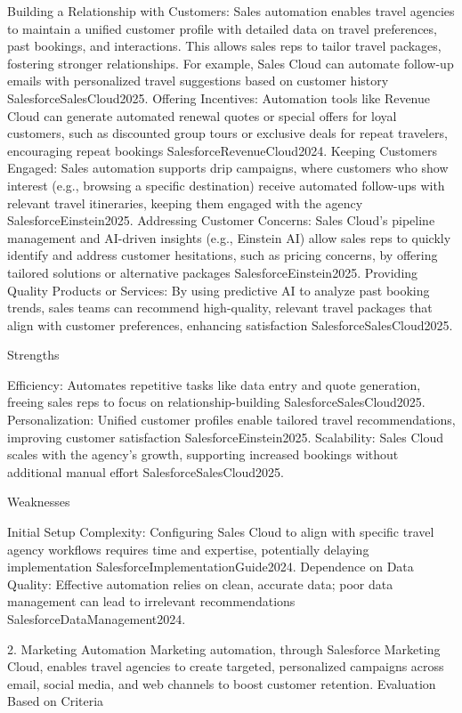 Building a Relationship with Customers: Sales automation enables travel agencies to maintain a unified customer profile with detailed data on travel preferences, past bookings, and interactions. This allows sales reps to tailor travel packages, fostering stronger relationships. For example, Sales Cloud can automate follow-up emails with personalized travel suggestions based on customer history {SalesforceSalesCloud2025}.
Offering Incentives: Automation tools like Revenue Cloud can generate automated renewal quotes or special offers for loyal customers, such as discounted group tours or exclusive deals for repeat travelers, encouraging repeat bookings {SalesforceRevenueCloud2024}.
Keeping Customers Engaged: Sales automation supports drip campaigns, where customers who show interest (e.g., browsing a specific destination) receive automated follow-ups with relevant travel itineraries, keeping them engaged with the agency {SalesforceEinstein2025}.
Addressing Customer Concerns: Sales Cloud’s pipeline management and AI-driven insights (e.g., Einstein AI) allow sales reps to quickly identify and address customer hesitations, such as pricing concerns, by offering tailored solutions or alternative packages {SalesforceEinstein2025}.
Providing Quality Products or Services: By using predictive AI to analyze past booking trends, sales teams can recommend high-quality, relevant travel packages that align with customer preferences, enhancing satisfaction {SalesforceSalesCloud2025}.

Strengths

Efficiency: Automates repetitive tasks like data entry and quote generation, freeing sales reps to focus on relationship-building {SalesforceSalesCloud2025}.
Personalization: Unified customer profiles enable tailored travel recommendations, improving customer satisfaction {SalesforceEinstein2025}.
Scalability: Sales Cloud scales with the agency’s growth, supporting increased bookings without additional manual effort {SalesforceSalesCloud2025}.

Weaknesses

Initial Setup Complexity: Configuring Sales Cloud to align with specific travel agency workflows requires time and expertise, potentially delaying implementation {SalesforceImplementationGuide2024}.
Dependence on Data Quality: Effective automation relies on clean, accurate data; poor data management can lead to irrelevant recommendations {SalesforceDataManagement2024}.

2. Marketing Automation
Marketing automation, through Salesforce Marketing Cloud, enables travel agencies to create targeted, personalized campaigns across email, social media, and web channels to boost customer retention.
Evaluation Based on Criteria

